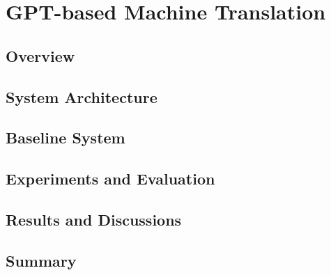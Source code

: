 \chapter{GPT-based Machine Translation}
\pagestyle{fancy}
\pagestyle{fancy}\chead{} \pagestyle{fancy}\rhead{}
\pagestyle{fancy} 
\pagestyle{fancy}\cfoot{} \pagestyle{fancy}\rfoot{\thepage}
\section{Overview}\label{start7}

\section{System Architecture}
\section{Baseline System}
\section{Experiments and Evaluation}
\section{Results and Discussions}
\section{Summary}

